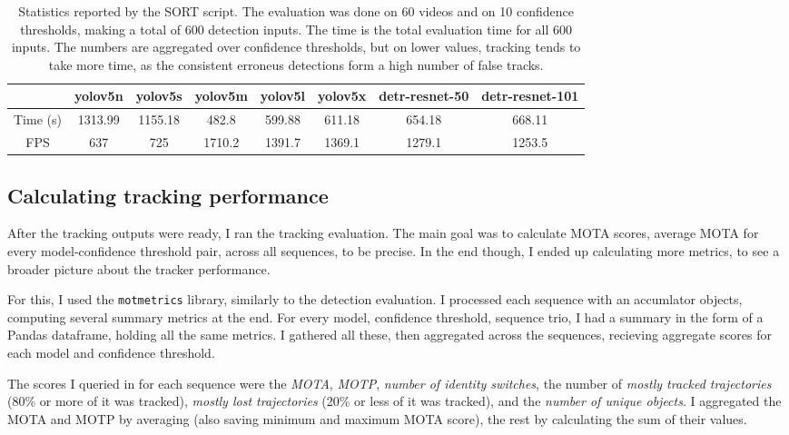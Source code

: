 \begin{table}[h]
    \begin{tabular}{|c|c|c|c|c|c|c|c|}
        \hline
         & yolov5n & yolov5s & yolov5m & yolov5l & yolov5x & detr-resnet-50 & detr-resnet-101 \\
        \hline
        \hline
        Time (s) & 1313.99 & 1155.18 & 482.8 & 599.88 & 611.18 & 654.18 & 668.11\\
        \hline
        \hline
        FPS  & 637 & 725 & 1710.2 & 1391.7 & 1369.1 & 1279.1 & 1253.5 \\
        \hline
    \end{tabular}
    \caption{Statistics reported by the SORT script. The evaluation was done on 60 videos and on 10 confidence thresholds, making a total of 600 detection inputs. The time is the total evaluation time for all 600 inputs. The numbers are aggregated over confidence thresholds, but on lower values, tracking tends to take more time, as the consistent erroneus detections form a high number of false tracks.}
    \label{tab:sort-times}
\end{table}

\subsection{Calculating tracking performance}

After the tracking outputs were ready, I ran the tracking evaluation. The main goal was to calculate MOTA scores, average MOTA for every model-confidence threshold pair, across all sequences, to be precise. In the end though, I ended up calculating more metrics, to see a broader picture about the tracker performance.

For this, I used the \verb|motmetrics| library, similarly to the detection evaluation. I processed each sequence with an accumlator objects, computing several summary metrics at the end. For every model, confidence threshold, sequence trio, I had a summary in the form of a Pandas dataframe, holding all the same metrics. I gathered all these, then aggregated across the sequences, recieving aggregate scores for each model and confidence threshold.

The scores I queried in for each sequence were the \textit{MOTA}, \textit{MOTP}, \textit{number of identity switches}, the number of \textit{mostly tracked trajectories} (80\% or more of it was tracked), \textit{mostly lost trajectories} (20\% or less of it was tracked), and the \textit{number of unique objects}. I aggregated the MOTA and MOTP by averaging (also saving minimum and maximum MOTA score), the rest by calculating the sum of their values.


